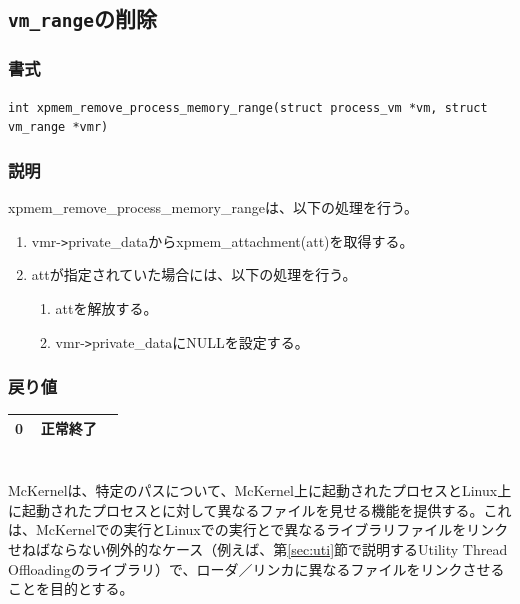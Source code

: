 \documentclass[twoside,11pt,fleqn]{book}
\begin{document}
\subsection{\texttt{vm\_range}の削除}
\subsubsection*{書式}{\quad}
\texttt{int xpmem\_remove\_process\_memory\_range(struct process\_vm *vm,
        struct vm\_range *vmr)
}

\subsubsection*{説明}{\quad}
xpmem\_remove\_process\_memory\_rangeは、以下の処理を行う。
\begin{enumerate}
  \item vmr-\verb|>|private\_dataからxpmem\_attachment(att)を取得する。
  \item attが指定されていた場合には、以下の処理を行う。
  \begin{enumerate}
    \item attを解放する。
    \item vmr-\verb|>|private\_dataにNULLを設定する。
  \end{enumerate}
\end{enumerate}

\subsubsection*{戻り値}{\quad}
\begin{table}[!h]
\footnotesize
\begin{tabular}{|p{0.20\linewidth}|p{0.66\linewidth}|} \hline
0&正常終了\\ \hline
\end{tabular}
\vspace{-0em}
\end{table}
\FloatBarrier

\section{}
McKernelは、特定のパスについて、McKernel上に起動されたプロセスとLinux上に起動されたプロセスとに対して異なるファイルを見せる機能を提供する。これは、McKernelでの実行とLinuxでの実行とで異なるライブラリファイルをリンクせねばならない例外的なケース（例えば、第\ref{sec:uti}節で説明するUtility Thread Offloadingのライブラリ）で、ローダ／リンカに異なるファイルをリンクさせることを目的とする。
\end{document}
